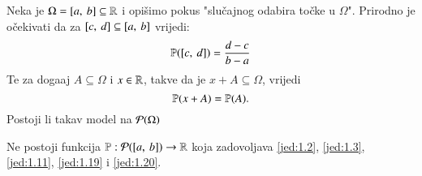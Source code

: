 \begin{pr}  \label{pr:1.18}
    Neka je $\Omega = [{a}, \:{b}] \subseteq \mathbb{R}$ i opi\v simo pokus "slu\v cajnog odabira to\v cke u $\Omega$".
    Prirodno je o\v cekivati da za $[{c}, \:{d}] \subseteq [{a}, \:{b}]$ vrijedi:
    \begin{equation} \label{jed:1.19}
        \mathbb{P}({[{c}, \:{d}]}) = \frac{d - c}{b - a}
    \end{equation}
    Te za doga\dj aj $A \subseteq \Omega$ i $x \in \mathbb{R}$, takve da je
    $x + A \subseteq \Omega$, vrijedi
    \begin{equation} \label{jed:1.20}
        \mathbb{P}({x + A}) = \mathbb{P}({A}).
    \end{equation}
    Postoji li takav model na $\mathcal{P}({\Omega})$
\end{pr}

\begin{tm}
    Ne postoji funkcija $\mathbb{P}: \mathcal{P}({[{a}, \:{b}]}) \to \mathbb{R}$ koja zadovoljava \eqref{jed:1.2}, \eqref{jed:1.3}, \eqref{jed:1.11}, \eqref{jed:1.19} i \eqref{jed:1.20}.
\end{tm}


